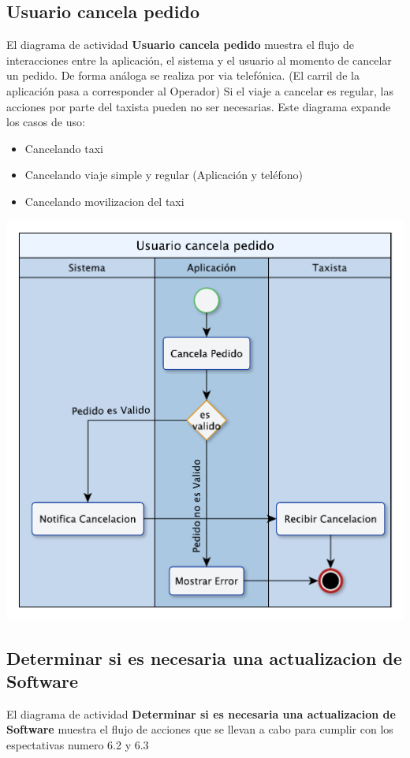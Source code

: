 \documentclass[a4paper]{article}
\begin{document}
\subsection{Usuario cancela pedido}
El diagrama de actividad \textbf{Usuario cancela pedido} muestra el flujo de interacciones entre la aplicaci\'on, el sistema y el usuario
al momento de cancelar un pedido. De forma an\'aloga se realiza por via telef\'onica. (El carril de la aplicaci\'on pasa a corresponder al Operador)
Si el viaje a cancelar es regular, las acciones por parte del taxista pueden no ser necesarias.
Este diagrama expande los casos de uso:
\begin{itemize}
\item Cancelando taxi
\item Cancelando viaje simple y regular (Aplicaci\'on y tel\'efono)
\item Cancelando movilizacion del taxi
\end{itemize}

\begin{center}
\includegraphics[scale=0.7]{DA_Cancela_Taxi.pdf}
\end{center}

\clearpage
\subsection{Determinar si es necesaria una actualizacion de Software}
El diagrama de actividad \textbf{Determinar si es necesaria una actualizacion de Software} muestra el flujo de acciones que se llevan a cabo
para cumplir con los espectativas numero 6.2 y 6.3
\end{document}
